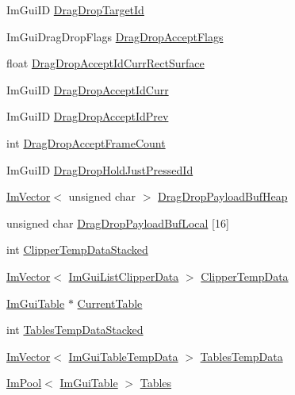 \begin{DoxyCompactItemize}
\item 
Im\+Gui\+ID \hyperlink{structImGuiContext_af8641ca16b62736c6af16364e65666ab}{Drag\+Drop\+Target\+Id}
\item 
Im\+Gui\+Drag\+Drop\+Flags \hyperlink{structImGuiContext_a7342ae93b69ed2c9d3ba08d184df2827}{Drag\+Drop\+Accept\+Flags}
\item 
float \hyperlink{structImGuiContext_a4a3aa38a5b88e2be8fd73b29e39e3fbc}{Drag\+Drop\+Accept\+Id\+Curr\+Rect\+Surface}
\item 
Im\+Gui\+ID \hyperlink{structImGuiContext_af0ac51e2f6bd98443fe5f135f3e2ecac}{Drag\+Drop\+Accept\+Id\+Curr}
\item 
Im\+Gui\+ID \hyperlink{structImGuiContext_ab835f6cb1536a4e91b6d589a100612f9}{Drag\+Drop\+Accept\+Id\+Prev}
\item 
int \hyperlink{structImGuiContext_a8163ed15c1f157390a3215dcb28feb9e}{Drag\+Drop\+Accept\+Frame\+Count}
\item 
Im\+Gui\+ID \hyperlink{structImGuiContext_a8367a60f9f9e1584bfb4e1352c70dcff}{Drag\+Drop\+Hold\+Just\+Pressed\+Id}
\item 
\hyperlink{structImVector}{Im\+Vector}$<$ unsigned char $>$ \hyperlink{structImGuiContext_af4797d5b38c5c659d1aa0160d46549d8}{Drag\+Drop\+Payload\+Buf\+Heap}
\item 
unsigned char \hyperlink{structImGuiContext_ac209d61ab1857e5e060a3b9d18254685}{Drag\+Drop\+Payload\+Buf\+Local} \mbox{[}16\mbox{]}
\item 
int \hyperlink{structImGuiContext_a87984176b7d56f1ff9968dbc2503974e}{Clipper\+Temp\+Data\+Stacked}
\item 
\hyperlink{structImVector}{Im\+Vector}$<$ \hyperlink{structImGuiListClipperData}{Im\+Gui\+List\+Clipper\+Data} $>$ \hyperlink{structImGuiContext_aa96236b841852cd5b6609d40dc19095b}{Clipper\+Temp\+Data}
\item 
\hyperlink{structImGuiTable}{Im\+Gui\+Table} $\ast$ \hyperlink{structImGuiContext_adbba564ef36512258c8e63b55c41c77e}{Current\+Table}
\item 
int \hyperlink{structImGuiContext_abc9df715f3ce4d380ac9687e11d2c9d3}{Tables\+Temp\+Data\+Stacked}
\item 
\hyperlink{structImVector}{Im\+Vector}$<$ \hyperlink{structImGuiTableTempData}{Im\+Gui\+Table\+Temp\+Data} $>$ \hyperlink{structImGuiContext_a63e5713a11fb1dd32218a5185b4ee920}{Tables\+Temp\+Data}
\item 
\hyperlink{structImPool}{Im\+Pool}$<$ \hyperlink{structImGuiTable}{Im\+Gui\+Table} $>$ \hyperlink{structImGuiContext_af98791565876933c63b1db9df4118116}{Tables}

\end{DoxyCompactItemize}
